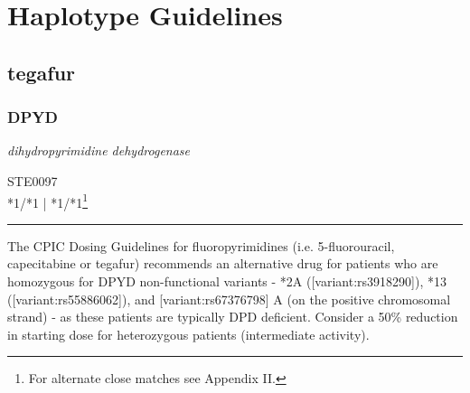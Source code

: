 \documentclass{report}
\begin{document}
\normalsize

\newpage

\section{Haplotype Guidelines}



























\subsection{ tegafur }

\subsubsection{ DPYD }
     \textit{ dihydropyrimidine dehydrogenase } \begin{flushright} \textsc{ STE0097 \\ *1/*1  | *1/*1\footnote{For alternate close matches see Appendix II.} }\end{flushright}
      \hrule \vspace{6pt}
      The CPIC Dosing Guidelines for fluoropyrimidines (i.e. 5-fluorouracil, capecitabine or tegafur) recommends an alternative drug for patients who are homozygous for DPYD non-functional variants - *2A ([variant:rs3918290]), *13 ([variant:rs55886062]), and [variant:rs67376798] A (on the positive chromosomal strand) - as these patients are typically DPD deficient.  Consider a 50\% reduction in starting dose for heterozygous patients (intermediate activity). \newline
      \scriptsize
      
\end{document}
